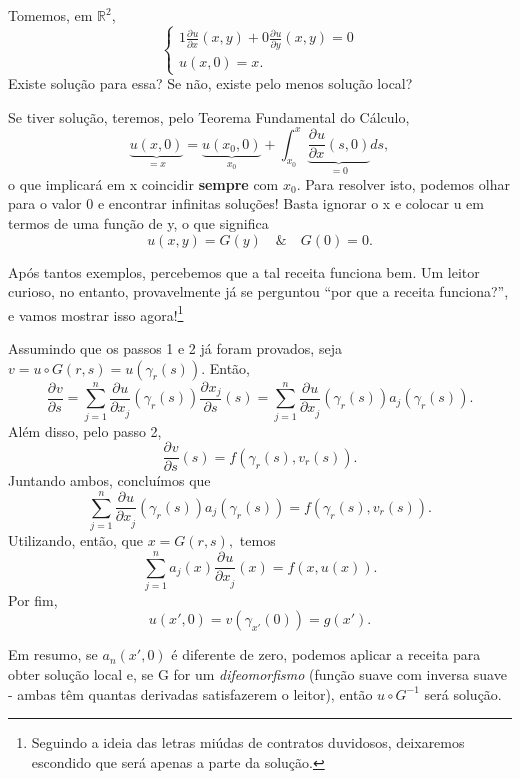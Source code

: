 \documentclass[../pde_notes.tex]{subfiles}
\begin{document}
\begin{example}
	Tomemos, em \(\mathbb{R}^{2}\),
	\[
		\left\{\begin{array}{ll}
			1\frac{\partial^{}u}{\partial x^{}}(x, y) + 0\frac{\partial^{}u}{\partial y^{}}(x, y) = 0 \\
			u(x, 0) = x.
		\end{array}\right.
	\]
	Existe solução para essa? Se não, existe pelo menos solução local?

	Se tiver solução, teremos, pelo Teorema Fundamental do Cálculo,
	\[
		\underbrace{u(x, 0)}_{=x} = \underbrace{u(x_{0}, 0)}_{x_{0}} + \int_{x_{0}}^{x}\underbrace{\frac{\partial^{}u}{\partial x^{}}(s, 0)}_{=0}ds,
	\]
	o que implicará em x coincidir \textbf{sempre} com \(x_{0}\). Para resolver isto, podemos olhar para o valor 0 e encontrar infinitas soluções! Basta ignorar o x e colocar u em termos de uma função de y, o que significa
	\[
		u(x, y) = G(y) \quad\&\quad G(0) = 0.
	\]
\end{example}

Após tantos exemplos, percebemos que a tal receita funciona bem. Um leitor curioso, no entanto, provavelmente já se perguntou ``por que a receita funciona?'', e vamos mostrar isso agora!\footnote{Seguindo a ideia das letras miúdas de contratos duvidosos, deixaremos escondido que será apenas a parte da solução.}
\begin{proof*}
	Assumindo que os passos 1 e 2 já foram provados, seja \(v = u \circ G(r, s) = u(\gamma_{r}(s))\). Então,
	\[
		\frac{\partial^{}v}{\partial s^{}} = \sum\limits_{j=1}^{n}\frac{\partial^{}u}{\partial x_{j}^{}}(\gamma_{r}(s))\frac{\partial^{}x_{j}}{\partial s^{}}(s) = \sum\limits_{j=1}^{n}\frac{\partial^{}u}{\partial x_{j}^{}}(\gamma_{r}(s))a_{j}(\gamma_{r}(s)).
	\]
	Além disso, pelo passo 2,
	\[
		\frac{\partial^{}v}{\partial s^{}}(s) = f(\gamma_{r}(s), v_{r}(s)).
	\]
	Juntando ambos, concluímos que
	\[
		\sum\limits_{j=1}^{n}\frac{\partial^{}u}{\partial x_{j}^{}}(\gamma_{r}(s))a_{j}(\gamma_{r}(s)) = f(\gamma_{r}(s), v_{r}(s)).
	\]
	Utilizando, então, que \(x = G(r, s),\) temos
	\[
		\sum\limits_{j=1}^{n}a_{j}(x)\frac{\partial^{}u}{\partial x_{j}^{}}(x) = f(x, u(x)).
	\]
	Por fim,
	\[
		u(x', 0) = v(\gamma_{x'}(0)) = g(x').
	\]
\end{proof*}
Em resumo, se \(a_{n}(x', 0)\) é diferente de zero, podemos aplicar a receita para obter solução local e, se G for um \textit{difeomorfismo} (função suave com inversa suave - ambas têm quantas derivadas satisfazerem o leitor), então \(u\circ G^{-1}\) será solução.
\end{document}
